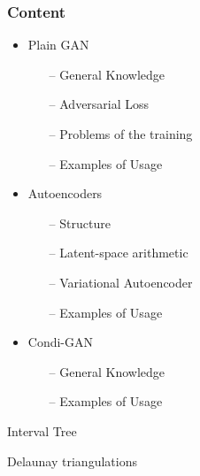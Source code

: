 \begin{frame}
	\frametitle{Content}
	\begin{itemize}
		\item Plain GAN
			\begin{itemize}
				\item[--] General Knowledge
				\item[--] Adversarial Loss
				\item[--] Problems of the training
				\item[--] Examples of Usage 
			\end{itemize}
		\item Autoencoders
			\begin{itemize}
				\item[--] Structure
				\item[--] Latent-space arithmetic
				\item[--] Variational Autoencoder
				\item[--] Examples of Usage 
			\end{itemize}
		\item Condi-GAN
			\begin{itemize}
				\item[--] General Knowledge
				\item[--] Examples of Usage 
			\end{itemize}
		
	\end{itemize}
\end{frame}

\endgroup

\begin{frame}{Interval Tree}

    
\end{frame}

\begin{frame}{Delaunay triangulations}

\cite{DeBerg2008}
    
\end{frame}



